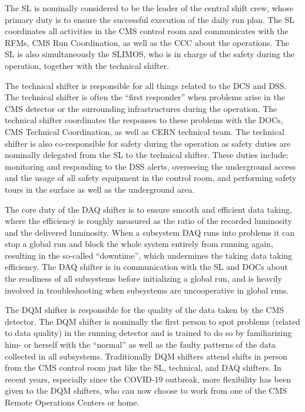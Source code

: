 The \ac{SL} is nominally considered to be the leader of the central shift crew, whose primary duty is to ensure the successful execution of the daily run plan. The \ac{SL} coordinates all activities in the \ac{CMS} control room and communicates with the \acp{RFM}, \ac{CMS} Run Coordination, as well as the \ac{CCC} about the operations. The \ac{SL} is also simultaneously the \ac{SLIMOS}, who is in charge of the safety during the operation, together with the technical shifter.

The technical shifter is responsible for all things related to the \ac{DCS} and \ac{DSS}. The technical shifter is often the ``first responder'' when problems arise in the \ac{CMS} detector or the surrounding infrastructures during the operation. The technical shifter coordinates the responses to these problems with the \acp{DOC}, \ac{CMS} Technical Coordination, as well as \ac{CERN} technical team. The technical shifter is also co-responsible for safety during the operation as safety duties are nominally delegated from the \ac{SL} to the technical shifter. These duties include: monitoring and responding to the \ac{DSS} alerts, overseeing the underground access and the usage of all safety equipment in the control room, and performing safety tours in the surface as well as the underground area. 

The core duty of the \ac{DAQ} shifter is to ensure smooth and efficient data taking, where the efficiency is roughly measured as the ratio of the recorded luminosity and the delivered luminosity. When a subsystem \ac{DAQ} runs into problems it can stop a global run and block the whole system entirely from running again, resulting in the so-called ``downtime'', which undermines the taking data taking efficiency. The \ac{DAQ} shifter is in communication with the \ac{SL} and \acp{DOC} about the readiness of all subsystems before initializing a global run, and is heavily involved in troubleshooting when subsystems are uncooperative in global runs. 

The \ac{DQM} shifter is responsible for the quality of the data taken by the \ac{CMS} detector. The \ac{DQM} shifter is nominally the first person to spot problems (related to data quality) in the running detector and is trained to do so by familiarizing him- or herself with the ``normal'' as well as the faulty patterns of the data collected in all subsystems. Traditionally \ac{DQM} shifters attend shifts in person from the \ac{CMS} control room just like the \ac{SL}, technical, and \ac{DAQ} shifters. In recent years, especially since the COVID-19 outbreak, more flexibility has been given to the \ac{DQM} shifters, who can now choose to work from one of the \ac{CMS} Remote Operations Centers or home.

